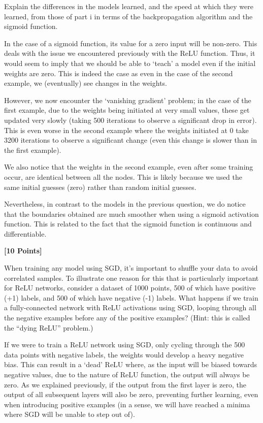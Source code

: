 Explain the differences in the models learned, and the speed at which they were learned, from those of part i in terms of the backpropagation algorithm and the sigmoid function.



\begin{subsolution}
 In the case of a sigmoid function, its value for a zero input will be non-zero. This deals with the issue we encountered previously with the ReLU function. Thus, it would seem to imply that we should be able to `teach' a model even if the initial weights are zero. This is indeed the case as even in the case of the second example, we (eventually) see changes in the weights. 

 However, we now encounter the `vanishing gradient' problem; in the case of the first example, due to the weights being initiated at very small values, these get updated very slowly (taking 500 iterations to observe a significant drop in error). This is even worse in the second example where the weights initiated at 0 take 3200 iterations to observe a significant change (even this change is slower than in the first example).

 We also notice that the weights in the second example, even after some training occur, are identical between all the nodes. This is likely because we used the same initial guesses (zero) rather than random initial guesses.
 
 Nevertheless, in contrast to the models in the previous question, we do notice that the boundaries obtained are much smoother when using a sigmoid activation function. This is related to the fact that the sigmoid function is continuous and differentiable.
\end{subsolution}



\problem \textbf{[10 Points]}

When training any model using SGD, it's important to shuffle your data to avoid correlated samples. To illustrate one reason for this that is particularly important for ReLU networks, consider a dataset of 1000 points, 500 of which have positive (+1) labels, and 500 of which have negative (-1) labels. What happens if we train a fully-connected network with ReLU activations using SGD, looping through all the negative examples before any of the positive examples? (Hint: this is called the ``dying ReLU'' problem.)

\begin{solution}
 If we were to train a ReLU network using SGD, only cycling through the 500 data points with negative labels, the weights would develop a heavy negative bias. This can result in a `dead' ReLU where, as the input will be biased towards negative values, due to the nature of ReLU function, the output will always be zero. As we explained previously, if the output from the first layer is zero, the output of all subsequent layers will also be zero, preventing further learning, even when introducing positive examples (in a sense, we will have reached a minima where SGD will be unable to step out of).
\end{solution}



